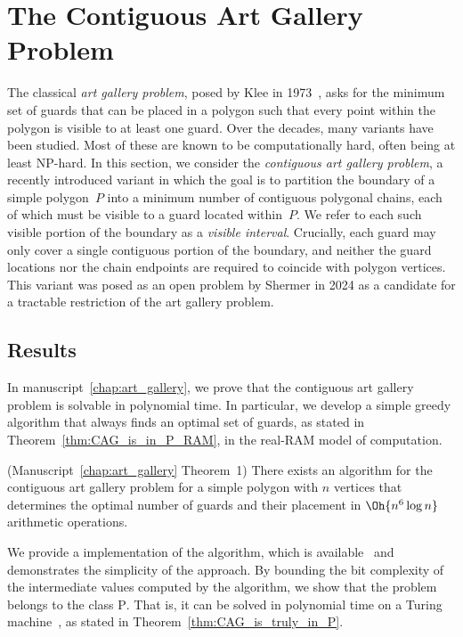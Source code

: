 \section{The Contiguous Art Gallery Problem}
\label{sec:The Contiguous Art Gallery Problem}
The classical \emph{art gallery problem}, posed by Klee in 1973~\cite{10.5555/40599}, asks for the minimum set of guards that can be placed in a polygon such that every point within the polygon is visible to at least one guard. 
Over the decades, many variants have been studied. 
Most of these are known to be computationally hard, often being at least \textsc{NP}-hard. 
In this section, we consider the \emph{contiguous art gallery problem}, a recently introduced variant in which the goal is to partition the boundary of a simple polygon~$P$ into a minimum number of contiguous polygonal chains, each of which must be visible to a guard located within~$P$. 
We refer to each such visible portion of the boundary as a \emph{visible interval}. 
Crucially, each guard may only cover a single contiguous portion of the boundary, and neither the guard locations nor the chain endpoints are required to coincide with polygon vertices. 
This variant was posed as an open problem by Shermer in 2024 as a candidate for a tractable restriction of the art gallery problem. 

\subsection{Results}
In manuscript~\ref{chap:art_gallery}, we prove that the contiguous art gallery problem is solvable in polynomial time. 
In particular, we develop a simple greedy algorithm that always finds an optimal set of guards, as stated in Theorem~\ref{thm:CAG_is_in_P_RAM}, in the real-RAM model of computation. 

\begin{theorem}(Manuscript~\ref{chap:art_gallery} Theorem~1) 
\label{thm:CAG_is_in_P_RAM}
    There exists an algorithm for the contiguous art gallery problem for a simple polygon with $n$ vertices that determines the optimal number of guards and their placement in $\Oh{n^6\log n}$ arithmetic operations. 
\end{theorem}

We provide a \Cpp implementation of the algorithm, which is available~\cite{github_impl} and demonstrates the simplicity of the approach. 
By bounding the bit complexity of the intermediate values computed by the algorithm, we show that the problem belongs to the class \textsc{P}. 
That is, it can be solved in polynomial time on a Turing machine~\cite{turing1936computable}, as stated in Theorem~\ref{thm:CAG_is_truly_in_P}.

